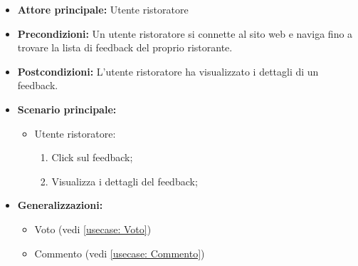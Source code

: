\label{usecase:Dettaglio feedback}
\begin{itemize}
	\item \textbf{Attore principale:}  Utente ristoratore
	\item \textbf{Precondizioni:}
	      Un utente ristoratore si connette al sito web e naviga fino a trovare la
	      lista di feedback del proprio ristorante.
	\item \textbf{Postcondizioni:}
	      L'utente ristoratore ha visualizzato i dettagli di un feedback.
	\item \textbf{Scenario principale:}
	      \begin{itemize}
		      \item  Utente ristoratore:
		            \begin{enumerate}
			            \item Click sul feedback;
			            \item Visualizza i dettagli del feedback;
		            \end{enumerate}
	      \end{itemize}
	\item \textbf{Generalizzazioni:}
	      \begin{itemize}
		      \item  Voto (vedi \autoref{usecase: Voto})
		      \item  Commento (vedi \autoref{usecase: Commento})
	      \end{itemize}
\end{itemize}
